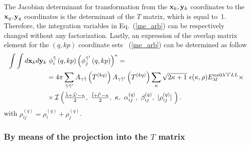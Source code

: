 \documentclass[12pt,a4paper,twoside]{article}
\begin{document}
The Jacobian determinant for transformation from the ${\bf x}_k, {\bf y}_k$ coordinates to the ${\bf x}_q, {\bf y}_q$ coordinates is the determinant of the $T$ matrix, which is equal to~1. Therefore, the integration variables in Eq.~(\ref{me_arb}) can be respectively changed without any factorization. Lastly, an expression of the overlap matrix element for the $(q,kp)$ coordinate sets ~(\ref{me_arb}) can be determined as follow
\begin{align}
\int \int d{\bf x}_k d{\bf y}_k & ~\phi_{i}^{\tilde{\gamma}}\left(q,kp \right) \left( \phi_{j}^{\tilde{\gamma}^{\prime}}\left(q,kp \right) \right)^{*}  = \nonumber 
\\ & = 4 \pi \sum_{\tilde{\gamma}\tilde{\gamma}^{\prime}}  A_{\gamma\tilde{\gamma}}\left( T^{(kq)} \right) A_{\gamma\tilde{\gamma}^{\prime}}\left( T^{(kq)} \right)
 \sum_{\kappa} \sqrt{2\kappa+1}~ \epsilon(\kappa, \rho) {E}^{\kappa \kappa 0 \lambda^{\prime} l^{\prime} L L}_{\lambda l} \times  \nonumber \\
 &\times \mathcal{I}\left(
 \tfrac{\tilde{\lambda}+\tilde{\lambda^{\prime}}-\kappa}{2}, ~
 \tfrac{\tilde{l}+\tilde{l^{\prime}}-\kappa}{2},~
 \kappa,~
 \alpha^{(q)}_{ij},~
 \beta^{(q)}_{ij} ,~
 \vert \rho^{(q)}_{ij} \vert ~
  \right).
\end{align}
with $\rho_{ij}^{(q)}=\rho_{i}^{(q)}+\rho_{j}^{(q)}$.

\subsubsection{By means of the projection into the $T$ matrix}
\end{document}
